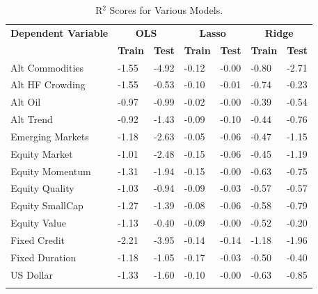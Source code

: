 \documentclass{ledger}
\begin{document}
\begin{table}[!ht]
\centering
	\caption{R\(^2\) Scores for Various Models. \label{table:r2_scores}}
	\begin{tabularx}{\textwidth}{l *{6}{X}}
	\toprule
		\textbf{Dependent Variable} & \multicolumn{2}{c}{\textbf{OLS}} & \multicolumn{2}{c}{\textbf{Lasso}} & \multicolumn{2}{c}{\textbf{Ridge}} \\
	\cmidrule(lr){2-3} \cmidrule(lr){4-5} \cmidrule(lr){6-7}
		& \textbf{Train} & \textbf{Test} & \textbf{Train} & \textbf{Test} & \textbf{Train} & \textbf{Test} \\
	\midrule
		Alt Commodities & -1.55 & -4.92 & -0.12 & -0.00 & -0.80 & -2.71 \\
		Alt HF Crowding & -1.55 & -0.53 & -0.10 & -0.01 & -0.74 & -0.23 \\
		Alt Oil & -0.97 & -0.99 & -0.02 & -0.00 & -0.39 & -0.54 \\
		Alt Trend & -0.92 & -1.43 & -0.09 & -0.10 & -0.44 & -0.76 \\
		Emerging Markets & -1.18 & -2.63 & -0.05 & -0.06 & -0.47 & -1.15 \\
		Equity Market & -1.01 & -2.48 & -0.15 & -0.06 & -0.45 & -1.19 \\
		Equity Momentum & -1.31 & -1.94 & -0.15 & -0.00 & -0.63 & -0.75 \\
		Equity Quality & -1.03 & -0.94 & -0.09 & -0.03 & -0.57 & -0.57 \\
		Equity SmallCap & -1.27 & -1.39 & -0.08 & -0.06 & -0.58 & -0.79 \\
		Equity Value & -1.13 & -0.40 & -0.09 & -0.00 & -0.52 & -0.20 \\
		Fixed Credit & -2.21 & -3.95 & -0.14 & -0.14 & -1.18 & -1.96 \\
		Fixed Duration & -1.18 & -1.05 & -0.17 & -0.03 & -0.50 & -0.40 \\
		US Dollar & -1.33 & -1.60 & -0.10 & -0.00 & -0.63 & -0.85 \\
	\bottomrule \\
	\end{tabularx} 
\end{table}
\end{document}

